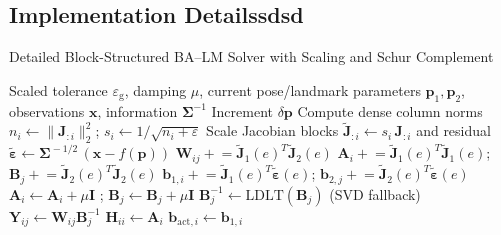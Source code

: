 \subsection{Implementation Detailssdsd}
\label{app:implementation}

\begin{algorithm}[H]
\caption{Detailed Block-Structured BA--LM Solver with Scaling and Schur Complement}
\begin{algorithmic}[1]
\small
\Require Scaled tolerance $\varepsilon_{\mathrm{g}}$, damping $\mu$, current pose/landmark parameters $\mathbf{p}_1,\mathbf{p}_2$, observations $\mathbf{x}$, information $\boldsymbol{\Sigma}^{-1}$
\Ensure Increment $\delta\mathbf{p}$
\State Compute dense column norms $n_i \gets \lVert \mathbf{J}_{:i} \rVert_2^2$; $s_i \gets 1/\sqrt{n_i+\varepsilon}$
\State Scale Jacobian blocks $\widetilde{\mathbf{J}}_{:i} \gets s_i\,\mathbf{J}_{:i}$ and residual $\widetilde{\boldsymbol{\varepsilon}} \gets \boldsymbol{\Sigma}^{\!-1/2}\,(\mathbf{x}-f(\mathbf{p}))$
  \State $\mathbf{W}_{ij} \mathrel{+}= \widetilde{\mathbf{J}}_{1}(e)^{T}\widetilde{\mathbf{J}}_{2}(e)$
  \State $\mathbf{A}_{i} \mathrel{+}= \widetilde{\mathbf{J}}_{1}(e)^{T}\widetilde{\mathbf{J}}_{1}(e)$;
  $\mathbf{B}_{j} \mathrel{+}= \widetilde{\mathbf{J}}_{2}(e)^{T}\widetilde{\mathbf{J}}_{2}(e)$
  \State $\mathbf{b}_{1,i} \mathrel{+}= \widetilde{\mathbf{J}}_{1}(e)^{T}\widetilde{\boldsymbol{\varepsilon}}(e)$;
  $\mathbf{b}_{2,j} \mathrel{+}= \widetilde{\mathbf{J}}_{2}(e)^{T}\widetilde{\boldsymbol{\varepsilon}}(e)$
\EndFor
 $\mathbf{A}_{i} \gets \mathbf{A}_{i}+\mu\mathbf{I}$ \EndFor;
 $\mathbf{B}_{j} \gets \mathbf{B}_{j}+\mu\mathbf{I}$ \EndFor
 $\mathbf{B}^{-1}_{j} \gets \text{LDLT}(\mathbf{B}_j)$ (SVD fallback) \EndFor
{} $\mathbf{Y}_{ij} \gets \mathbf{W}_{ij}\mathbf{B}^{-1}_{j}$ \EndFor
  \State $\mathbf{H}_{ii} \gets \mathbf{A}_{i}$
  \State $\mathbf{b}_{\mathrm{act},i} \gets \mathbf{b}_{1,i}$

\end{algorithmic}
\end{algorithm}

